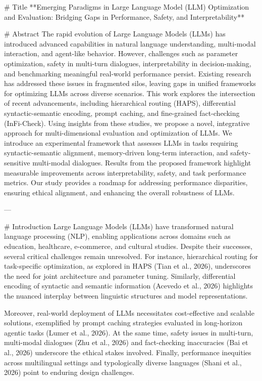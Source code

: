 # Title  
**Emerging Paradigms in Large Language Model (LLM) Optimization and Evaluation: Bridging Gaps in Performance, Safety, and Interpretability**

# Abstract  
The rapid evolution of Large Language Models (LLMs) has introduced advanced capabilities in natural language understanding, multi-modal interaction, and agent-like behavior. However, challenges such as parameter optimization, safety in multi-turn dialogues, interpretability in decision-making, and benchmarking meaningful real-world performance persist. Existing research has addressed these issues in fragmented silos, leaving gaps in unified frameworks for optimizing LLMs across diverse scenarios. This work explores the intersection of recent advancements, including hierarchical routing (HAPS), differential syntactic-semantic encoding, prompt caching, and fine-grained fact-checking (InFi-Check). Using insights from these studies, we propose a novel, integrative approach for multi-dimensional evaluation and optimization of LLMs. We introduce an experimental framework that assesses LLMs in tasks requiring syntactic-semantic alignment, memory-driven long-term interaction, and safety-sensitive multi-modal dialogues. Results from the proposed framework highlight measurable improvements across interpretability, safety, and task performance metrics. Our study provides a roadmap for addressing performance disparities, ensuring ethical alignment, and enhancing the overall robustness of LLMs.

---

# Introduction  
Large Language Models (LLMs) have transformed natural language processing (NLP), enabling applications across domains such as education, healthcare, e-commerce, and cultural studies. Despite their successes, several critical challenges remain unresolved. For instance, hierarchical routing for task-specific optimization, as explored in HAPS (Tian et al., 2026), underscores the need for joint architecture and parameter tuning. Similarly, differential encoding of syntactic and semantic information (Acevedo et al., 2026) highlights the nuanced interplay between linguistic structures and model representations.

Moreover, real-world deployment of LLMs necessitates cost-effective and scalable solutions, exemplified by prompt caching strategies evaluated in long-horizon agentic tasks (Lumer et al., 2026). At the same time, safety issues in multi-turn, multi-modal dialogues (Zhu et al., 2026) and fact-checking inaccuracies (Bai et al., 2026) underscore the ethical stakes involved. Finally, performance inequities across multilingual settings and typologically diverse languages (Shani et al., 2026) point to enduring design challenges.

